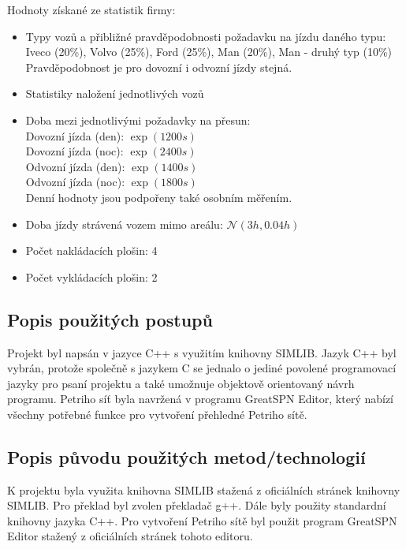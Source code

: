 \documentclass[a4paper, 11pt]{article}
\begin{document}
\noindent Hodnoty získané ze statistik firmy:
\begin{itemize}
\item Typy vozů a přibližné pravděpodobnosti požadavku na jízdu daného typu: \\
Iveco (20\%), Volvo (25\%), Ford (25\%), Man (20\%), Man - druhý typ (10\%)\\
Pravděpodobnost je pro dovozní i odvozní jízdy stejná.

\item Statistiky naložení jednotlivých vozů

\item Doba mezi jednotlivými požadavky na přesun:\\
Dovozní jízda (den): $\exp(1200s)$\\
Dovozní jízda (noc): $\exp(2400s)$\\
Odvozní jízda (den): $\exp(1400s)$\\
Odvozní jízda (noc): $\exp(1800s)$\\
Denní hodnoty jsou podpořeny také osobním měřením.

\item Doba jízdy strávená vozem mimo areálu: $\mathcal{N}(3h, 0.04h)$
\item Počet nakládacích plošin: 4
\item Počet vykládacích plošin: 2
\end{itemize}

\subsection{Popis použitých postupů}
Projekt byl napsán v jazyce C++ s využitím knihovny SIMLIB\cite{SIML}. Jazyk C++ byl vybrán, protože společně s jazykem C se jednalo o jediné povolené programovací jazyky pro psaní projektu\cite{Zadani} a také umožnuje objektově orientovaný návrh programu. Petriho síť byla navržená v programu GreatSPN Editor, který nabízí všechny potřebné funkce pro vytvoření přehledné Petriho sítě.

\subsection{Popis původu použitých metod/technologií}
K projektu byla využita knihovna SIMLIB stažená z oficiálních stránek knihovny SIMLIB\cite{SIML}. Pro překlad byl zvolen překladač g++\cite{G}. Dále byly použity standardní knihovny jazyka C++. Pro vytvoření Petriho sítě byl použit program GreatSPN Editor stažený z oficiálních stránek tohoto editoru\cite{SPN}.
\end{document}
